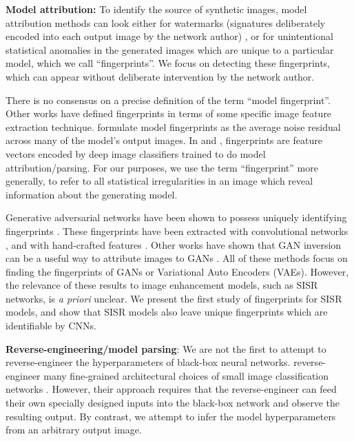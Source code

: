 \documentclass[10pt]{article} %
\begin{document}
\textbf{Model attribution:} To identify the source of synthetic images, model attribution methods can look either for watermarks (signatures deliberately encoded into each output image by the network author) \citep{adi2018turning,Hayes2020TowardsTP,Skripniuk2020BlackBoxWF,yu2021artificial,Zhang2020ModelWF}, or for unintentional statistical anomalies in the generated images which are unique to a particular model, which we call ``fingerprints''. We focus on detecting these fingerprints, which can appear without deliberate intervention by the network author. 

There is no consensus on a precise definition of the term ``model fingerprint''. Other works have defined fingerprints in terms of some specific image feature extraction technique. \cite{marra2018gans} formulate model fingerprints as the average noise residual across many of the model's output images. In \cite{yu2019attributing} and \citep{Asnani2021ReverseEO}, fingerprints are feature vectors encoded by deep image classifiers trained to do model attribution/parsing. For our purposes, we use the term ``fingerprint'' more generally, to refer to all statistical irregularities in an image which reveal information about the generating model.

Generative adversarial networks have been shown to possess uniquely identifying fingerprints \citep{marra2018gans,yu2019attributing}. These fingerprints have been extracted with convolutional networks \citep{Xuan2019ScalableFG,yu2019attributing,jain2021improving}, and with hand-crafted features \citep{Goebel2020DetectionAA,Guarnera_2020,marra2018gans}. Other works have shown that GAN inversion can be a useful way to attribute images to GANs \citep{Albright2019SourceGA,zhang2020deepfake}. All of these methods focus on finding the fingerprints of GANs or Variational Auto Encoders (VAEs). However, the relevance of these results to image enhancement models, such as SISR networks, is \textit{a priori} unclear. We present the first study of fingerprints for SISR models, and show that  SISR models also leave unique fingerprints which are identifiable by CNNs.

\textbf{Reverse-engineering/model parsing}:
We are not the first to attempt to reverse-engineer the hyperparameters of black-box neural networks.
\citep{oh2019towards} reverse-engineer many fine-grained architectural choices of small image classification networks . However, their approach requires that the reverse-engineer can feed their own specially designed inputs into the black-box network and observe the resulting output. By contrast, we attempt to infer the model hyperparameters from an arbitrary output image.
\end{document}
